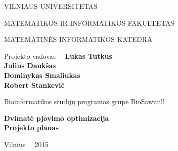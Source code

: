 \documentclass[a4paper,12pt]{article}
\begin{document}
\graphicspath{ {/} }

\renewcommand{\cftdot}{.}	
\renewcommand{\cftsecleader}{\cftdotfill{\cftdotsep}}

\thispagestyle{empty} %


\begin{center}
 VILNIAUS UNIVERSITETAS 
 
MATEMATIKOS IR INFORMATIKOS FAKULTETAS

MATEMATINĖS INFORMATIKOS KATEDRA

\vspace{4cm}

Projekto vadovas \ \ \textbf{Lukas Tutkus} \\
\textbf{Julius Daukšas} \\
\textbf{Dominykas Smaliukas} \\
\textbf{Robert Stankevič} \\

\vspace{0.2cm}

Bioinformatikos studijų programos grupė BioSawmill



\vspace{3cm}
\textbf{\Large Dvimatė pjovimo optimizacija}\\
\textbf{\Large Projekto planas}

\vfill

Vilnius \ \  2015
\end{center}



\clearpage

\tableofcontents
\clearpage
\end{document}
